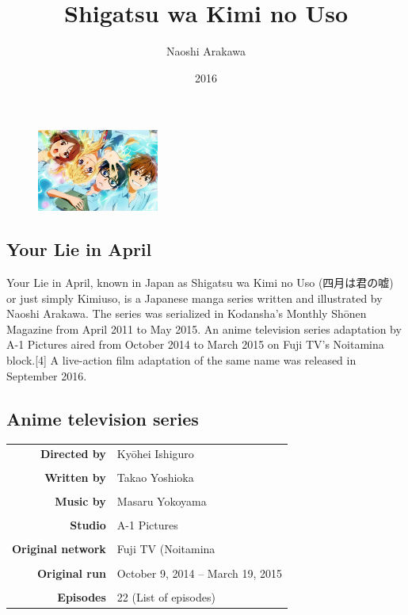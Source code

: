 \documentclass[a4paper,10pt]{article}
\title{Shigatsu wa Kimi no Uso}
\author{Naoshi Arakawa}
\date{2016}
\begin{document}
\maketitle

\begin{figure}[h]
\begin{center}
\includegraphics[width=4cm]{YLIA.jpg}
\end{center}
\end{figure}

\begin{CJK}{UTF8}{min}

\section{Your Lie in April}
Your Lie in April, known in Japan as Shigatsu wa Kimi no Uso (四月は君の嘘)\\
or just simply Kimiuso, is a Japanese manga series written and illustrated by Naoshi Arakawa. The series was serialized in Kodansha's Monthly Shōnen Magazine from April 2011 to May 2015. An anime television series adaptation by A-1 Pictures aired from October 2014 to March 2015 on Fuji TV's Noitamina block.[4] A live-action film adaptation of the same name was released in September 2016.\\
\subsection{Anime television series}
\begin{table}[h]
\begin{tabular}{r|l}

\textbf{Directed by}      & Kyōhei Ishiguro\\\\
\textbf{Written by}       & Takao Yoshioka\\\\
\textbf{Music by}         & Masaru Yokoyama\\\\
\textbf{Studio}           &  	A-1 Pictures\\\\
\textbf{Original network} & Fuji TV (Noitamina\\\\
\textbf{Original run}     & October 9, 2014 – March 19, 2015\\\\
\textbf{Episodes}         & 22 (List of episodes)


\end{tabular}
\end{table}
\end{CJK}
\end{document}
